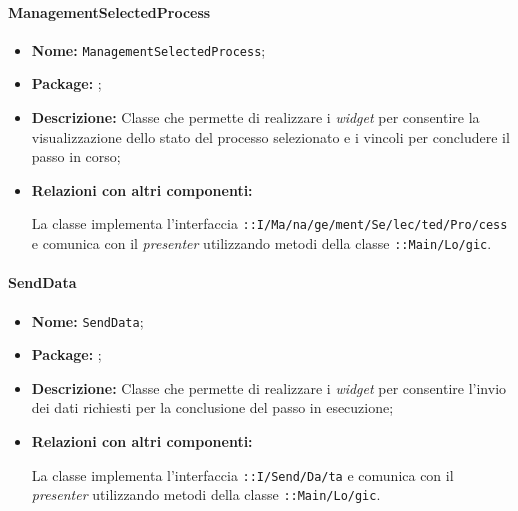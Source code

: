 \paragraph{ManagementSelectedProcess}
\begin{flushleft}
\begin{itemize}
\item \textbf{Nome:} \texttt{ManagementSelectedProcess};
\item \textbf{Package:} \texttt{\viewAdmin{}};
\item \textbf{Descrizione:} Classe che permette di realizzare i \textit{widget} per consentire la visualizzazione dello stato del processo selezionato e i vincoli per concludere il passo in corso;
\item \textbf{Relazioni con altri componenti:}
\begin{sloppypar}
La classe implementa l'interfaccia \texttt{\iViewUser{}::I\fshyp{}Ma\fshyp{}na\fshyp{}ge\fshyp{}ment\fshyp{}Se\fshyp{}lec\fshyp{}ted\fshyp{}Pro\fshyp{}cess} e comunica con il \textit{presenter} utilizzando metodi della classe \texttt{\logicUser{}::Main\fshyp{}Lo\fshyp{}gic}.
\end{sloppypar}
\end{itemize}
\end{flushleft}

\paragraph{SendData}
\begin{flushleft}
\begin{itemize}
\item \textbf{Nome:} \texttt{SendData};
\item \textbf{Package:} \texttt{\viewAdmin{}};
\item \textbf{Descrizione:} Classe che permette di realizzare i \textit{widget} per consentire l'invio dei dati richiesti per la conclusione del passo in esecuzione;
\item \textbf{Relazioni con altri componenti:}
\begin{sloppypar}
La classe implementa l'interfaccia \texttt{\iViewUser{}::I\fshyp{}Send\fshyp{}Da\fshyp{}ta} e comunica con il \textit{presenter} utilizzando metodi della classe \texttt{\logicUser{}::Main\fshyp{}Lo\fshyp{}gic}.
\end{sloppypar}
\end{itemize}
\end{flushleft}

